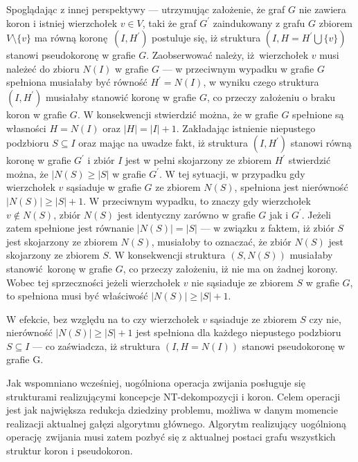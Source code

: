 {\begin{bproof}
    Spoglądając z innej perspektywy --- utrzymując założenie, że graf $G$ nie zawiera koron i istniej wierzchołek $v \in V$, taki że graf $G^\prime$ zaindukowany z grafu $G$ zbiorem $V \setminus \{v\}$ ma równą koronę $(I, H^\prime)$ postuluje się, iż struktura $(I, H=H^\prime \bigcup\{v\})$ stanowi pseudokoronę w grafie $G$.
    Zaobserwować należy, iż wierzchołek $v$ musi należeć do zbioru $N(I)$ w grafie $G$ --- w przeciwnym wypadku w grafie $G$ spełniona musiałaby być równość $H^\prime=N(I)$, w wyniku czego struktura $(I, H^\prime)$ musiałaby stanowić koronę w grafie $G$, co przeczy założeniu o braku koron w grafie $G$.
    W konsekwencji stwierdzić można, że w grafie $G$ spełnione są własności $H=N(I)$ oraz $|H|=|I|+1$.
    Zakładając istnienie niepustego podzbioru $S \subseteq I$ oraz mając na uwadze fakt, iż struktura $(I, H^\prime)$ stanowi równą koronę w grafie $G^\prime$ i zbiór $I$ jest w pełni skojarzony ze zbiorem $H^\prime$ stwierdzić można, że $|N(S) \geq |S|$ w grafie $G^\prime$.
    W tej sytuacji, w przypadku gdy wierzchołek $v$ sąsiaduje w grafie $G$ ze zbiorem $N(S)$, spełniona jest nierówność $|N(S)| \geq |S| + 1$.
    W przeciwnym wypadku, to znaczy gdy wierzchołek $v \notin N(S)$, zbiór $N(S)$ jest identyczny zarówno w grafie $G$ jak i $G^\prime$.
    Jeżeli zatem spełnione jest równanie $|N(S)|=|S|$ --- w związku z faktem, iż zbiór $S$ jest skojarzony ze zbiorem $N(S)$, musiałoby to oznaczać, że zbiór $N(S)$ jest skojarzony ze zbiorem $S$.
    W konsekwencji struktura $(S, N(S))$ musiałaby stanowić koronę w grafie $G$, co przeczy założeniu, iż nie ma on żadnej korony.
    Wobec tej sprzeczności jeżeli wierzchołek $v$ nie sąsiaduje ze zbiorem $S$ w grafie $G$, to spełniona musi być właściwość $|N(S)| \geq |S| + 1$.

    W efekcie, bez względu na to czy wierzchołek $v$ sąsiaduje ze zbiorem $S$ czy nie, nierówność $|N(S)| \geq |S| + 1$ jest spełniona dla każdego niepustego podzbioru $S \subseteq I$ --- co zaświadcza, iż struktura $(I, H=N(I))$ stanowi pseudokoronę w grafie G.
  \end{bproof}

  Jak wspomniano wcześniej, uogólniona operacja zwijania posługuje się strukturami realizującymi koncepcje NT-dekompozycji i koron.
  Celem operacji jest jak największa redukcja dziedziny problemu, możliwa w danym momencie realizacji aktualnej gałęzi algorytmu głównego.
  Algorytm realizujący uogólnioną operację zwijania musi zatem pozbyć się z aktualnej postaci grafu wszystkich struktur koron i pseudokoron.

}
